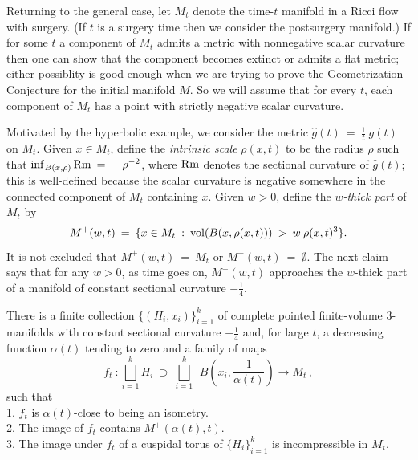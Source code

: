 Returning to the general case,
let $M_t$ denote the time-$t$ manifold in a Ricci flow with surgery.
(If $t$ is a surgery time
then we consider the postsurgery manifold.)
If for some $t$
a component of
$M_t$ admits a metric with
nonnegative scalar curvature then one can show  that
the component becomes extinct or admits a flat metric; either possiblity
is good enough when we are trying to prove the Geometrization
Conjecture for the initial manifold $M$.
So we will assume
that for every  $t$, each component of $M_t$ has a point with strictly
negative scalar curvature.


Motivated by the hyperbolic
example, we consider the metric $\widehat{g}(t) \: = \: \frac{1}{t} \: g(t)$
on $M_t$. Given $x \in M_t$, define the {\em intrinsic scale} $\rho(x,t)$ to be
the radius $\rho$ such that $\inf_{B(x,\rho)} \operatorname{Rm} \: = \: - \: \rho^{-2}$,
where $\operatorname{Rm}$ denotes the sectional curvature of $\widehat{g}(t)$; this
is well-defined because the scalar curvature is negative somewhere in
the connected component of $M_t$ containing $x$.
Given $w > 0$, define the
{\em $w$-thick part} of $M_t$ by
\begin{equation}
M^+(w,t) \: = \:
\{ x \in M_t \: : \: \operatorname{vol}(B(x, \rho(x,t))) \: > \: w \: \rho(x,t)^3 \}.
\end{equation}
It is not excluded that $M^+(w,t) \: = \: M_t$ or $M^+(w,t) \: = \:
\emptyset$.
The next claim says that for any $w > 0$, as time goes on,
$M^+(w,t)$ approaches the $w$-thick part of a manifold of
constant sectional curvature $- \frac14$.

\begin{proposition}
  \label{prop:kl-overview-ricci-flow-approach-manifold-geometrization-existence-sectional-curvature}
 \cite{Perelman2} \label{introclaim5}
There is a finite collection
$\{ (H_i, x_i) \}_{i=1}^k$ of complete pointed finite-volume $3$-manifolds
with constant sectional curvature $- \frac14$ and, for large $t$,
a decreasing function $\alpha(t)$ tending to zero and a family
of maps
\begin{equation}
f_t \: : \bigsqcup_{i=1}^k H_i\:\supset\: \bigsqcup_{i=1}^k
\:\:B \left( x_i, \frac{1}{\alpha(t)} \right)
 \rightarrow M_t\,,
\end{equation}
such that\\
1. $f_t$ is $\alpha(t)$-close to being an isometry. \\
2. The image of $f_t$ contains $M^+(\alpha(t), t)$.\\
3. The image under $f_t$ of a cuspidal torus of
$\{H_i\}_{i=1}^k$ is incompressible in $M_t$.
\end{proposition}

